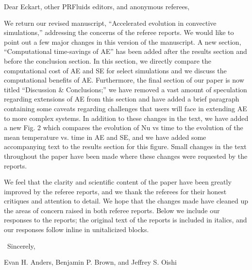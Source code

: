 \documentclass[aps, 11pt, singlecolumn]{revtex4-1} %
\begin{document}
\newenvironment{myquotation}{
\begin{quotation}
\itshape
}{ 
\end{quotation}
}
\noindent
Dear Eckart, other PRFluids editors, and anonymous referees,
$\,$\newline

\begin{singlespace}
We return our revised manuscript, ``Accelerated evolution in
convective simulations,'' addressing the concerns of the referee reports.
We would like to point out a few major changes in this version of the manuscript.
A new section, ``Computational time-savings of AE'' has been added after the
results section and before the conclusion section. In this section, we directly
compare the computational cost of AE and SE for select simulations and we discuss
the computational benefits of AE.  Furthermore, the final section of our paper
is now titled ``Discussion \& Conclusions;'' we have removed a vast amount
of speculation regarding extensions of AE from this section and have added
a brief paragraph containing some caveats regarding challenges that users will face in
extending AE to more complex systems.  In addition to these changes in the text,
we have added a new Fig. 2 which compares the evolution of Nu vs time to the
evolution of the
mean temperature vs. time in AE and SE, 
and we have added some accompanying text to the results section for this
figure.  Small changes in the text throughout the paper have
been made where these changes were requested by the reports.

We feel that the clarity and scientific content of the paper have been greatly
improved by the referee reports, and we thank the referees for their honest 
critiques and attention to detail. We hope that the changes made have
cleaned up the areas of concern raised in both referee reports.  Below we
include our responses to the reports; the original text of the reports is included
in italics, and our responses follow inline in unitalicized blocks.

$\,$\newline
\noindent
Sincerely,

Evan H. Anders, Benjamin P. Brown, and Jeffrey S. Oishi





\end{singlespace}
\end{document}
